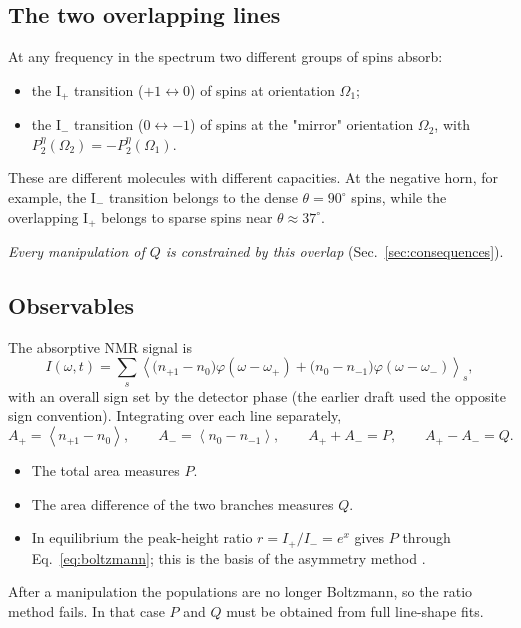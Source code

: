 \documentclass[11pt]{article}
\newcommand{\avg}[1]{\left\langle #1\right\rangle}
\newcommand{\Pt}{P_2}
\begin{document}
\subsection{The two overlapping lines}
\label{sec:overlap}
At any frequency in the spectrum two different groups of spins absorb:
\begin{itemize}
\item the I$_+$ transition ($+1\leftrightarrow0$) of spins at orientation $\Omega_1$;
\item the I$_-$ transition ($0\leftrightarrow-1$) of spins at the "mirror" orientation
$\Omega_2$, with $\Pt^\eta(\Omega_2)=-\Pt^\eta(\Omega_1)$.
\end{itemize}
These are different molecules with different capacities. At the negative horn, for example,
the I$_-$ transition belongs to the dense $\theta=90^\circ$ spins, while the overlapping
I$_+$ belongs to sparse spins near $\theta\approx37^\circ$.

\emph{Every manipulation of $Q$ is constrained by this overlap}
(Sec.~\ref{sec:consequences}).

\subsection{Observables}
\label{sec:observables}
The absorptive NMR signal is
\begin{equation}
I(\omega,t)=\sum_s\avg{\big(n_{+1}-n_0\big)\varphi(\omega-\omega_+)+\big(n_0-n_{-1}\big)\varphi(\omega-\omega_-)}_s ,
\label{eq:line}
\end{equation}
with an overall sign set by the detector phase (the earlier draft used the opposite sign
convention). Integrating over each line separately,
\[
A_+=\avg{n_{+1}-n_0},\qquad A_-=\avg{n_0-n_{-1}},\qquad
A_++A_-=P,\qquad A_+-A_-=Q .
\]
\begin{itemize}
\item The total area measures $P$.
\item The area difference of the two branches measures $Q$.
\item In equilibrium the peak-height ratio $r=I_+/I_-=e^{x}$ gives $P$ through
Eq.~\eqref{eq:boltzmann}; this is the basis of the asymmetry method \cite{Dulya1997}.
\end{itemize}
After a manipulation the populations are no longer Boltzmann, so the ratio method fails. In
that case $P$ and $Q$ must be obtained from full line-shape fits.

\end{document}
